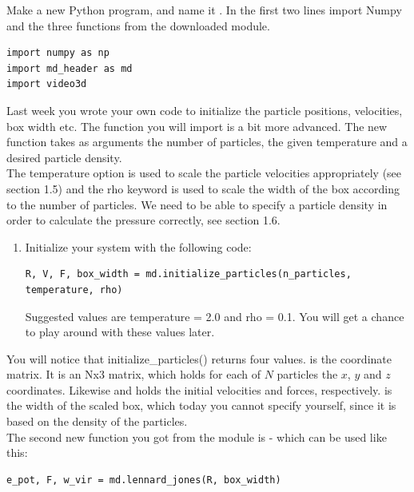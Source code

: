 \documentclass{article}
\begin{document}
Make a new Python program, and name it .
In the first two lines import Numpy and the three functions from the downloaded module.

\begin{lstlisting}
import numpy as np
import md_header as md
import video3d
\end{lstlisting}

Last week you wrote your own code to initialize the particle positions, velocities, box width etc.
The  function you will import is a bit more advanced.
%
The new  function takes as arguments the number of particles, the given temperature and a desired particle density.\\

The temperature option is used to scale the particle velocities appropriately (see section 1.5) and the rho keyword is used to scale the width of the box according to the number of particles.
We need to be able to specify a particle density in order to calculate the pressure correctly, see section 1.6.

\begin{enumerate}

    \item Initialize your system with the following code:

\begin{lstlisting}
R, V, F, box_width = md.initialize_particles(n_particles, temperature, rho)
\end{lstlisting}

        Suggested values are temperature = 2.0 and rho = 0.1.
        You will get a chance to play around with these values later.

\end{enumerate}

You will notice that initialize\_particles() returns four values.
 is the coordinate matrix.
It is an Nx3 matrix, which holds for each of $N$ particles the $x$, $y$ and $z$ coordinates.
Likewise  and  holds the initial velocities and forces, respectively.
 is the width of the scaled box, which today you cannot specify yourself,
since it is based on the density of the particles.\\

The second new function you got from the  module is  - which can be used like this:

\begin{lstlisting}
e_pot, F, w_vir = md.lennard_jones(R, box_width)
\end{lstlisting}
\end{document}
